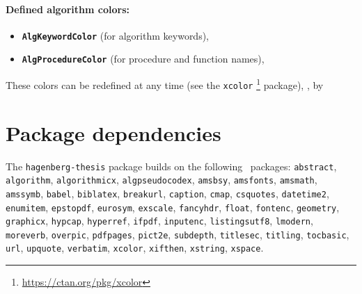 \documentclass[english]{hgbarticle}
\begin{document}
\paragraph{Defined algorithm colors:}
\begin{itemize}
\item[] \textbf{\texttt{AlgKeywordColor}} (for algorithm keywords),
\item[] \textbf{\texttt{AlgProcedureColor}} (for procedure and function names),
\end{itemize}
These colors can be redefined at any time (see the \texttt{xcolor}%
\footnote{\url{https://ctan.org/pkg/xcolor}} package), \eg, by
\begin{LaTeXCode}[numbers=none]
\end{LaTeXCode}


\section{Package dependencies}

\begin{sloppypar}
The \texttt{hagenberg-thesis} package builds on the following \latex\ packages:\newline
\texttt{abstract}, 
\texttt{algorithm}, 
\texttt{algorithmicx}, 
\texttt{algpseudocodex}, 
\texttt{amsbsy}, 
\texttt{amsfonts}, 
\texttt{amsmath}, 
\texttt{amssymb}, 
\texttt{babel}, 
\texttt{biblatex}, 
\texttt{breakurl}, 
\texttt{caption}, 
\texttt{cmap}, 
\texttt{csquotes}, 
\texttt{datetime2}, 
\texttt{enumitem}, 
\texttt{epstopdf}, 
\texttt{eurosym}, 
\texttt{exscale}, 
\texttt{fancyhdr}, 
\texttt{float}, 
\texttt{fontenc}, 
\texttt{geometry}, 
\texttt{graphicx}, 
\texttt{hypcap}, 
\texttt{hyperref}, 
\texttt{ifpdf}, 
\texttt{inputenc}, 
\texttt{listingsutf8}, 
\texttt{lmodern}, 
\texttt{moreverb}, 
\texttt{overpic}, 
\texttt{pdfpages}, 
\texttt{pict2e}, 
\texttt{subdepth}, 
\texttt{titlesec}, 
\texttt{titling},
\texttt{tocbasic},
\texttt{url}, 
\texttt{upquote}, 
\texttt{verbatim}, 
\texttt{xcolor}, 
\texttt{xifthen},
\texttt{xstring},
\texttt{xspace}.
\end{sloppypar}
\end{document}
